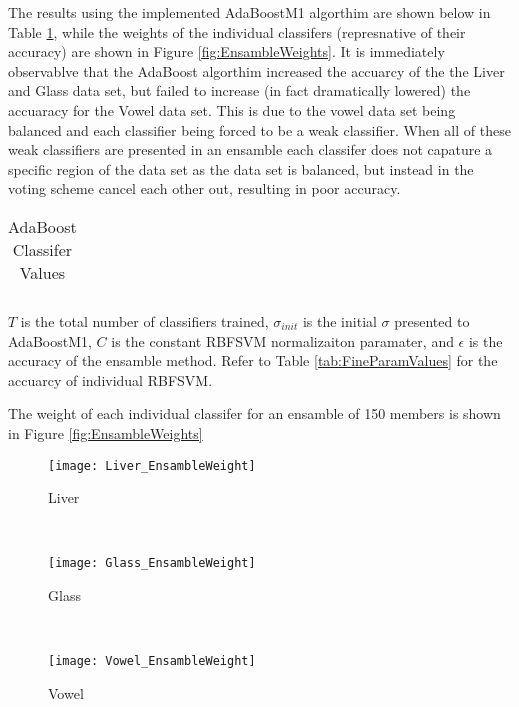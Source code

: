 The results using the implemented AdaBoostM1 algorthim are shown below in Table \ref{tab:AdaBoostValues}, while the weights of the individual classifers (represnative of their accuracy) are shown in Figure \ref{fig:EnsambleWeights}.
It is immediately observablve that the AdaBoost algorthim increased the accuarcy of the the Liver and Glass data set, but failed to increase (in fact dramatically lowered) the accuaracy for the Vowel data set.
This is due to the vowel data set being balanced and each classifier being forced to be a weak classifier.
When all of these weak classifiers are presented in an ensamble each classifer does not capature a specific region of the data set as the data set is balanced, but instead in the voting scheme cancel each other out, resulting in poor accuracy.
\begin{table}[!ht]
\caption{AdaBoost Classifer Values}
\label{tab:AdaBoostValues}
\begin{center}
\begin{tabular}{c c c c c}
\hline

\\
\hline

\hline
\end{tabular}
\end{center}
\normalsize
$T$ is the total number of classifiers trained, $\sigma_{init}$ is the initial $\sigma$ presented to AdaBoostM1, $C$ is the constant RBFSVM normalizaiton paramater, and $\epsilon$ is the accuracy of the ensamble method.  Refer to Table \ref{tab:FineParamValues} for the accuarcy of individual RBFSVM.
\end{table}

The weight of each individual classifer for an ensamble of 150 members is shown in Figure \ref{fig:EnsambleWeights}
\begin{figure*}[!ht]
	\centering
	\begin{subfigure}[b]{0.3\textwidth}
		\centering
		\texttt{[image: Liver\_EnsambleWeight]}
      \caption{Liver}
	\end{subfigure}%
	~
	\begin{subfigure}[b]{0.3\textwidth}
		\centering
		\texttt{[image: Glass\_EnsambleWeight]}
        \caption{Glass}
	\end{subfigure}	
    ~
	\begin{subfigure}[b]{0.3\textwidth}
		\centering
		\texttt{[image: Vowel\_EnsambleWeight]}
        \caption{Vowel}
	\end{subfigure}%
	\caption{Distribution of Ensamble Weights}
	\label{fig:EnsambleWeights}
\end{figure*}
